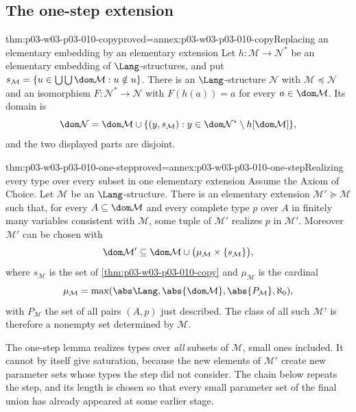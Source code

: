 \subsection{The one-step extension}
\label{sec:p03-w03-p03-010-one-step}

\begin{hblemma}{thm:p03-w03-p03-010-copy}{proved=annex:p03-w03-p03-010-copy}{Replacing an elementary embedding by an elementary extension}
Let \(h:\mathcal M\to\mathcal N^*\) be an elementary embedding of
\(\Lang\)-structures, and put
\(s_{\mathcal M}=\{u\in\bigcup\bigcup\dom\mathcal M:u\notin u\}\).
There is an \(\Lang\)-structure \(\mathcal N\) with
\(\mathcal M\preccurlyeq\mathcal N\) and an isomorphism
\(F:\mathcal N^*\to\mathcal N\) with \(F(h(a))=a\) for every
\(a\in\dom\mathcal M\).  Its domain is
\[
  \dom\mathcal N=\dom\mathcal M\cup
  \{(y,s_{\mathcal M}):y\in\dom\mathcal N^*\setminus h[\dom\mathcal M]\},
\]
and the two displayed parts are disjoint.
\end{hblemma}

\begin{hblemma}{thm:p03-w03-p03-010-one-step}{proved=annex:p03-w03-p03-010-one-step}{Realizing every type over every subset in one elementary extension}
Assume the Axiom of Choice.  Let \(\mathcal M\) be an \(\Lang\)-structure.
There is an elementary extension \(\mathcal M'\succcurlyeq\mathcal M\)
such that, for every \(A\subseteq\dom\mathcal M\) and every complete type
\(p\) over \(A\) in finitely many variables consistent with \(\mathcal M\),
some tuple of \(\mathcal M'\) realizes \(p\) in \(\mathcal M'\).
Moreover \(\mathcal M'\) can be chosen with
\[
 \dom\mathcal M'\subseteq\dom\mathcal M\cup
 \bigl(\mu_{\mathcal M}\times\{s_{\mathcal M}\}\bigr),
\]
where \(s_{\mathcal M}\) is the set of \cref{thm:p03-w03-p03-010-copy} and
\(\mu_{\mathcal M}\) is the cardinal
\[
 \mu_{\mathcal M}=\max(\abs\Lang,\abs{\dom\mathcal M},\abs{P_{\mathcal M}},\aleph_0),
\]
with \(P_{\mathcal M}\) the set of all pairs \((A,p)\) just described.
The class of all such \(\mathcal M'\) is therefore a nonempty set
determined by \(\mathcal M\).
\end{hblemma}

The one-step lemma realizes types over \emph{all} subsets of
\(\mathcal M\), small ones included.  It cannot by itself give saturation,
because the new elements of \(\mathcal M'\) create new parameter sets whose
types the step did not consider.  The chain below repeats the step, and its
length is chosen so that every small parameter set of the final union has
already appeared at some earlier stage.

